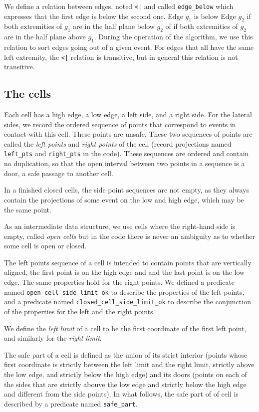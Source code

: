 \documentclass[a4paper, USenglish, cleveref, autoref, thm-restate]{lipics-v2021}
\begin{document}
We define a relation between edges, noted {\tt <|} and called
{\tt edge\_below} which expresses
that the first edge is below the second one.  Edge \(g_1\) is below Edge
\(g_2\) if both extremities of \(g_1\) are in the half plane below
\(g_2\) of if both extremities of \(g_2\) are in the half plane above
\(g_1\).  During the operation of the algorithm, we use this relation
to sort edges going out of a given event.  For edges that all have the
same left extremity, the {\tt <|} relation is transitive, but in
general this relation is not transitive.
\subsection{The cells}
Each cell has a high edge, a low edge, a left side, and a right side.  For
the lateral sides, we record the ordered sequence of points that
correspond  to events in contact with this cell.  These points are
unsafe.  These two sequences of points are called the {\em left
  points} and {\em right points} of the cell (record projections
named {\tt left\_pts} and {\tt right\_pts} in the code).
These sequences are
ordered and contain no duplication, so that the open interval between two
points in a sequence is a door, a safe passage to another cell.

In a finished closed cells, the side point sequences are not empty,
as they always contain the projections of some event on the low and high
edge, which may be the same point.

As an intermediate data structure, we use cells where the
right-hand side is empty, called {\em open cells}  but in the code
there is never an ambiguity as to whether some cell is open or closed.

The left points sequence of a cell is intended to contain
points that are vertically aligned, the first point is on the high edge and
and the last point is on the low edge.  The same properties hold for the
right points.  We defined a predicate named
{\tt open\_cell\_side\_limit\_ok} to describe the properties of the
left points, and a predicate named {\tt closed\_cell\_side\_limit\_ok} to
describe the conjunction of the properties for the left and the right points.

We define the {\em left limit} of a cell to be the first coordinate of
the first left point, and similarly for the {\em right limit}.

The safe part of a cell is defined as the union of its strict interior
(points whose first coordinate is strictly between the left limit and the
right limit, strictly above the low edge, and strictly below the
high edge) and its doors (points on each of the sides that are
strictly abouve the low edge and strictly below the high edge and
different from the side points).  In what follows, the safe part of of cell
is described by a predicate named {\tt safe\_part}.
\end{document}
